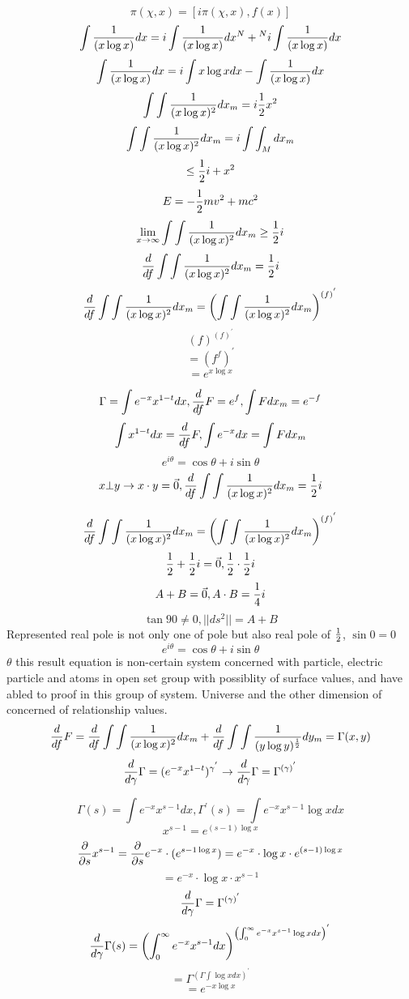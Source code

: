 \documentclass{jsarticle}
\begin{document}
{  $$ \pi(\chi,x) = [i\pi(\chi,x),f(x)] $$
  $$ \int{1 \over (x \log x)}dx = i \int{1 \over (x \log x)}dx^{N}  
  + {}^{N} i \int{1 \over (x \log x)}dx $$
  $$  \int{1 \over (x \log x)}dx = i \int{x \log x}dx 
  - \int{1 \over (x \log x)}dx $$
  $$ \int \int{1 \over (x \log x)^2}dx_m = i {1 \over 2}x^2 $$
  $$ \int \int{1 \over (x \log x)^2}dx_m = i \int \int_M dx_m $$
  $$ \le {1 \over 2}i + x^2 $$
  $$ E = - {1 \over 2}mv^2 + mc^2 $$
  $$ \lim_{x \to \infty} \int \int{1 \over (x \log x)^2}dx_m \ge {1 \over 2}i $$
  $$ {d \over df}\int \int{1 \over (x \log x)^2}dx_m = {1 \over 2}i $$
  $$ {d \over df}\int \int{1 \over (x \log x)^2}dx_m = 
  \left(\int \int {1 \over (x \log x)^2}dx_m \right)^{(f)^{'}}$$
  $$ (f)^{(f)^{'}} $$
  $$ = (f^f)^{'} $$
  $$ = e^{x \log x} $$

  $$ \Gamma = \int {e^{-x}x^{1-t}}dx, 
  {d \over df}F = e^f, \int F dx_m = e^{-f} $$
  $$ \int x^{1-t}dx = {d \over df}F, \int e^{-x}dx = \int F dx_m $$
  $$ e^{i \theta} = \cos \theta + i \sin \theta $$
  $$ x \bot y \to x \cdot y = \vec{0}, 
  {d \over df}\int \int{1 \over (x \log x)^2}dx_m = {1 \over 2}i $$

  $$ {d \over df}\int \int{1 \over (x \log x)^2}dx_m = 
  \left(\int \int {1 \over (x \log x)^2}dx_m \right)^{(f)^{'}}$$
  $$ {1 \over 2} + {1 \over 2}i = \vec{0}, {1 \over 2}\cdot{1 \over 2}i $$
  $$ A + B  =  \vec{0}, A \cdot B = {1 \over 4}i $$
  $$  \tan 90 \neq 0, ||ds^2|| = A + B $$
  Represented real pole is not only one of pole but also real pole of 
  $ {1 \over 2} $, 
  $\sin 0 = 0$ $$ e^{i \theta} = \cos \theta + i \sin \theta $$
  $\theta $
  this result equation is non-certain system concerned with particle, electric 
  particle and atoms in open set group with possiblity of surface values,
  and have abled to proof in this group of system. Universe and the other
  dimension of concerned of relationship values.
  $$ {d \over df}F = {d \over df} \int \int{1 \over (x \log x)^2}dx_m 
  + {d \over df} \int \int {1 \over (y \log y)^{1 \over 2}}dy_m
  = \Gamma(x,y) $$
  $$ {d \over d \gamma}\Gamma = (e^{-x}x^{1-t})^{\gamma^{'}} \to
  {d \over d \gamma}\Gamma = \Gamma^{(\gamma)^{'}}$$



    $$ \Gamma(s) = \int e^{-x} x^{s - 1}dx, \Gamma^{'}(s)
    = \int e^{-x} x^{s - 1}\log x dx $$
    $$ x^{s - 1} = e^{(s - 1)\log x} $$
    $$ {\partial \over \partial s}x^{s - 1} =
       {\partial \over \partial s}e^{-x}\cdot (e^{{s - 1}\log x}) 
       = e^{-x}\cdot \log x \cdot e^{(s - 1) \log x} $$
    $$ = e^{-x}\cdot \log x \cdot x^{s - 1} $$
    $$ {d \over d \gamma}\Gamma = \Gamma^{(\gamma)^{'}} $$
    $$ {d \over d \gamma}\Gamma(s) = \left( \int^{\infty}_{0}e^{-x}
    x^{s - 1}dx \right)^{\left(\int^{\infty}_{0}e^{-x}x^{s - 1}\log x dx
    \right)^{'}} $$
    $$ = \Gamma^{(\Gamma \int \log x dx)^{'}} $$
    $$ = e^{-x \log x} $$

}
\end{document}
